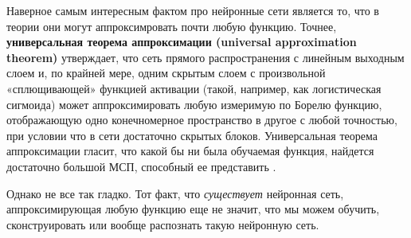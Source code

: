 Наверное самым интересным фактом про нейронные сети является то, что 
в теории они могут аппроксимровать почти любую функцию. Точнее, 
\textbf{универсальная теорема аппроксимации (universal approximation theorem)} 
утверждает, что сеть прямого
распространения с линейным выходным слоем и, по крайней мере, одним скрытым
слоем с произвольной «сплющивающей» функцией активации (такой, например, как
логистическая сигмоида) может аппроксимировать любую измеримую по Борелю
функцию, отображающую одно конечномерное пространство в другое с любой точ­ностью, 
при условии что в сети достаточно скрытых блоков. Универсальная теорема 
аппроксимации гласит, что какой бы ни была обучаемая
функция, найдется достаточно большой МСП, способный ее представить \cite{Goodfellow-et-al-2016}.

Однако не все так гладко. Тот факт, что \textit{существует} нейронная сеть, 
аппроксимирующая любую функцию еще не значит, что мы можем обучить, сконструировать 
или вообще распознать такую нейронную сеть.





